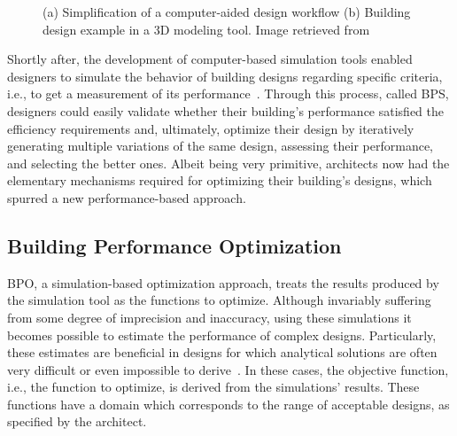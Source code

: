 \begin{figure}[htbp]
\centering
{}%
\hfill
{}%

\caption[General views of Traditional Design Approaches]{(a) Simplification of a computer-aided design workflow (b) Building design example in a 3D modeling tool. Image retrieved from~\cite{3DMODELTOOL}}
\label{fig:traditionaldesign}
\end{figure}

Shortly after, the development of computer-based simulation tools enabled designers to simulate the behavior of building designs regarding specific criteria, i.e., to get a measurement of its performance~\cite{Malkawi2005}. Through this process, called \ac{BPS}, designers could easily validate whether their building's performance satisfied the efficiency requirements and, ultimately, optimize their design by iteratively generating multiple variations of the same design, assessing their performance, and selecting the better ones. Albeit being very primitive, architects now had the elementary mechanisms required for optimizing their building's designs, which spurred a new performance-based approach.

\subsection{Building Performance Optimization}

	\ac{BPO}, a simulation-based optimization approach, treats the results produced by the simulation tool as the functions to optimize. Although invariably suffering from some degree of imprecision and inaccuracy, using these simulations it becomes possible to estimate the performance of complex designs. Particularly, these estimates are beneficial in designs for which analytical solutions are often very difficult or even impossible to derive~\cite{Kolda2003}. In these cases, the objective function, i.e., the function to optimize, is derived from the simulations' results. These functions have a domain which corresponds to the range of acceptable designs, as specified by the architect.

